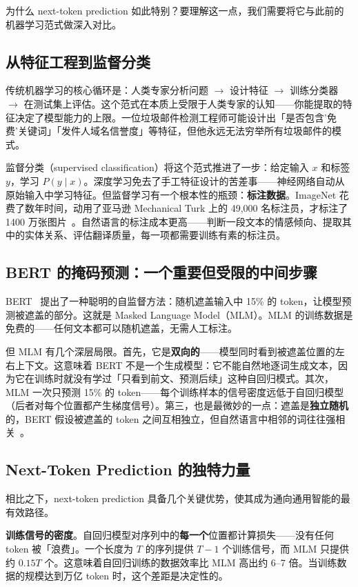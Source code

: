 为什么 next-token prediction 如此特别？要理解这一点，我们需要将它与此前的机器学习范式做深入对比。

\subsection{从特征工程到监督分类}

传统机器学习的核心循环是：人类专家分析问题 $\to$ 设计特征 $\to$ 训练分类器 $\to$ 在测试集上评估。这个范式在本质上受限于人类专家的认知——你能提取的特征决定了模型能力的上限。一位垃圾邮件检测工程师可能设计出「是否包含'免费'关键词」「发件人域名信誉度」等特征，但他永远无法穷举所有垃圾邮件的模式。

监督分类（supervised classification）将这个范式推进了一步：给定输入 $x$ 和标签 $y$，学习 $P(y \mid x)$。深度学习免去了手工特征设计的苦差事——神经网络自动从原始输入中学习特征。但监督学习有一个根本性的瓶颈：\textbf{标注数据}。ImageNet 花费了数年时间，动用了亚马逊 Mechanical Turk 上的 49,000 名标注员，才标注了 1400 万张图片~\cite{deng2009imagenet}。自然语言的标注成本更高——判断一段文本的情感倾向、提取其中的实体关系、评估翻译质量，每一项都需要训练有素的标注员。

\subsection{BERT 的掩码预测：一个重要但受限的中间步骤}

BERT~\cite{devlin2019bert} 提出了一种聪明的自监督方法：随机遮盖输入中 15\% 的 token，让模型预测被遮盖的部分。这就是 Masked Language Model（MLM）。MLM 的训练数据是免费的——任何文本都可以随机遮盖，无需人工标注。

但 MLM 有几个深层局限。首先，它是\textbf{双向的}——模型同时看到被遮盖位置的左右上下文。这意味着 BERT 不是一个生成模型：它不能自然地逐词生成文本，因为它在训练时就没有学过「只看到前文、预测后续」这种自回归模式。其次，MLM 一次只预测 15\% 的 token——每个训练样本的信号密度远低于自回归模型（后者对每个位置都产生梯度信号）。第三，也是最微妙的一点：遮盖是\textbf{独立随机}的，BERT 假设被遮盖的 token 之间互相独立，但自然语言中相邻的词往往强相关~\cite{yang2019xlnet}。

\subsection{Next-Token Prediction 的独特力量}

相比之下，next-token prediction 具备几个关键优势，使其成为通向通用智能的最有效路径。

\textbf{训练信号的密度}。自回归模型对序列中的\textbf{每一个}位置都计算损失——没有任何 token 被「浪费」。一个长度为 $T$ 的序列提供 $T-1$ 个训练信号，而 MLM 只提供约 $0.15T$ 个。这意味着自回归训练的数据效率比 MLM 高出约 6--7 倍。当训练数据的规模达到万亿 token 时，这个差距是决定性的。

